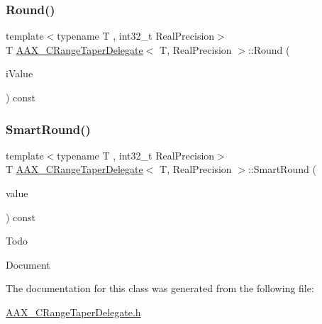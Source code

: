 \mbox{\label{a01557_a67b913916d7296ad69bf262363704e6f}} 
\subsubsection{\texorpdfstring{Round()}{Round()}}
{\footnotesize\ttfamily template$<$typename T , int32\+\_\+t Real\+Precision$>$ \\
T \mbox{\hyperlink{a01557}{A\+A\+X\+\_\+\+C\+Range\+Taper\+Delegate}}$<$ T, Real\+Precision $>$\+::Round (\begin{DoxyParamCaption}\item[{double}]{i\+Value }\end{DoxyParamCaption}) const\hspace{0.3cm}{\ttfamily [protected]}}

\mbox{\label{a01557_a4b0c76eb0cd262598dbe5118068fbefb}} 
\subsubsection{\texorpdfstring{SmartRound()}{SmartRound()}}
{\footnotesize\ttfamily template$<$typename T , int32\+\_\+t Real\+Precision$>$ \\
T \mbox{\hyperlink{a01557}{A\+A\+X\+\_\+\+C\+Range\+Taper\+Delegate}}$<$ T, Real\+Precision $>$\+::Smart\+Round (\begin{DoxyParamCaption}\item[{double}]{value }\end{DoxyParamCaption}) const\hspace{0.3cm}{\ttfamily [protected]}}

\begin{DoxyRefDesc}{Todo}
\item[\mbox{\hyperlink{a00785__todo000024}{Todo}}]Document \end{DoxyRefDesc}


The documentation for this class was generated from the following file\+:\begin{DoxyCompactItemize}
\item 
\mbox{\hyperlink{a00467}{A\+A\+X\+\_\+\+C\+Range\+Taper\+Delegate.\+h}}\end{DoxyCompactItemize}
